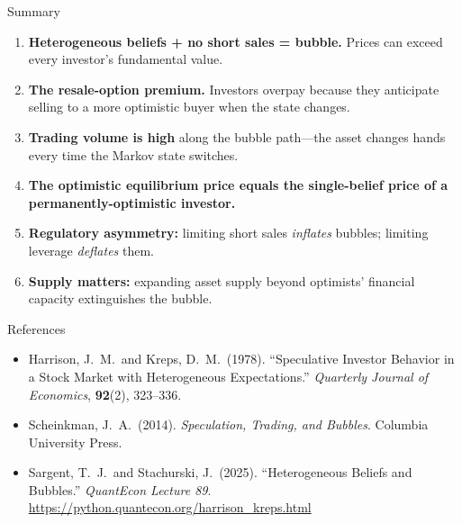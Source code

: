 \documentclass[aspectratio=169]{beamer}
\begin{document}
\begin{frame}{Summary}
  \begin{enumerate}
    \item \textbf{Heterogeneous beliefs + no short sales = bubble.}
          Prices can exceed every investor's fundamental value.

    \medskip
    \item \textbf{The resale-option premium.} Investors overpay because they
          anticipate selling to a more optimistic buyer when the state changes.

    \medskip
    \item \textbf{Trading volume is high} along the bubble path---the asset
          changes hands every time the Markov state switches.

    \medskip
    \item \textbf{The optimistic equilibrium price equals the single-belief
          price of a permanently-optimistic investor.}

    \medskip
    \item \textbf{Regulatory asymmetry:} limiting short sales \emph{inflates}
          bubbles; limiting leverage \emph{deflates} them.

    \medskip
    \item \textbf{Supply matters:} expanding asset supply beyond optimists'
          financial capacity extinguishes the bubble.
  \end{enumerate}
\end{frame}

\begin{frame}{References}
  \begin{itemize}
    \item Harrison, J.~M.\ and Kreps, D.~M.\ (1978).
          ``Speculative Investor Behavior in a Stock Market with Heterogeneous
          Expectations.''
          \emph{Quarterly Journal of Economics}, \textbf{92}(2), 323--336.

    \medskip
    \item Scheinkman, J.~A.\ (2014).
          \emph{Speculation, Trading, and Bubbles}.
          Columbia University Press.

    \medskip
    \item Sargent, T.~J.\ and Stachurski, J.\ (2025).
          ``Heterogeneous Beliefs and Bubbles.''
          \emph{QuantEcon Lecture 89}.
          \url{https://python.quantecon.org/harrison_kreps.html}
  \end{itemize}
\end{frame}

\end{document}
